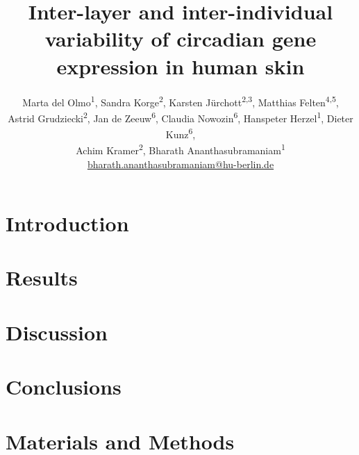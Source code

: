 \documentclass[twoside]{article} %
\title{
	Inter-layer and inter-individual variability of circadian gene expression in human skin} %
\author{%
	Marta del Olmo\textsuperscript{1}, Sandra Korge\textsuperscript{2}, Karsten J\"urchott\textsuperscript{2,3}, Matthias Felten\textsuperscript{4,5},\\[.1ex]
	Astrid Grudziecki\textsuperscript{2}, Jan de Zeeuw\textsuperscript{6}, Claudia Nowozin\textsuperscript{6}, Hanspeter Herzel\textsuperscript{1}, Dieter Kunz\textsuperscript{6},\\[.1ex]
	Achim Kramer\textsuperscript{2}, Bharath Ananthasubramaniam\textsuperscript{1}\\[1ex]
\normalsize \href{mailto:bharath.ananthasubramaniam@hu-berlin.de}{bharath.ananthasubramaniam@hu-berlin.de} %
}
\date{} %
\begin{document}
\maketitle


\section{Introduction}



\section{Results}


\section{Discussion}


\section{Conclusions}

\listoftodos
\newpage
\section{Materials and Methods}

\newpage
\section*{}

\newpage
\setcounter{table}{0}
\setcounter{figure}{0}
\renewcommand{\thetable}{S\arabic{table}}%
\renewcommand{\thefigure}{S\arabic{figure}}%
\end{document}
